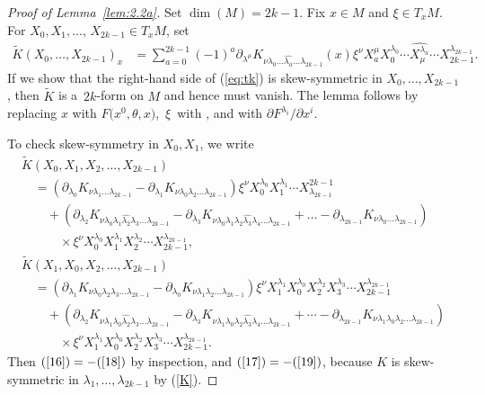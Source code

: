\documentclass[pdftex]{sigma}
\numberwithin{equation}{section}
\theoremstyle{definition}
\newcommand{\bm}{ M}
\begin{document}
\begin{proof}[Proof of Lemma~\ref{lem:2.2a}]
Set $\dim (M) = 2k-1. $ Fix
 $x\in \bm$ and $\xi\in T_x\bm$.
 For $X_0, X_1,\dots$, $ X_{2k-1}\in T_x\bm$, set
 \begin{align}\label{eq:tk}\tilde K(X_0,\dots, X_{2k-1})_x
&=
\sum_{a=0}^{2k-1} (-1)^a\partial_{\lambda^\mu} K_{\nu \lambda_0 \dots \widehat{\lambda_a}\dots\lambda_{2k-1}}
(x)\xi^\nu
X_a^{\mu} X_0^{\lambda_0}\cdots \widehat{X_\mu^{\lambda_a}} \cdots X_{2k-1}^{\lambda_{2k-1}}.
\end{align}
If we show that the right-hand side of (\ref{eq:tk}) is skew-symmetric in $X_0,\dots, X_{2k-1}$, then
$\tilde K
$ is a~$2k$-form on $\bm$ and hence must vanish. The lemma follows by replacing $x$ with
$F\bigl(x^0,\theta,x\bigr)$,~$\xi$~with , and  with $\partial F^{\lambda_i}/\partial x^i$.

To check skew-symmetry in $X_0, X_1$, we write
\begin{gather}
{\tilde{K}(X_0,X_1, X_2,\dots, X_{2k-1})
}\nonumber\\
\quad{}= (\partial_{\lambda_0} K_{\nu \lambda_1\dots \lambda_{2k-1}}
- \partial_{\lambda_1} K_{\nu \lambda_0 \lambda_2 \dots\lambda_{2k-1}})
\xi^\nu
X_0^{\lambda_0} X_1^{\lambda_1} \cdots X^{2k-1}_{\lambda_{2k-1}}
\label{16}\\
\qquad{}+ (\partial_{\lambda_2} K_{\nu \lambda_0 \lambda_1 \widehat{\lambda_2} \lambda_3\dots \lambda_{2k-1}}
-\partial_{\lambda_3} K_{\nu \lambda_0 \lambda_1 \lambda_2\widehat{\lambda_3}\lambda_4\dots \lambda_{2k-1}}
+\dots - \partial_{\lambda_{2k-1}}K_{\nu\lambda_0\dots\lambda_{2k-1}})\nonumber\\
\qquad\quad{} \times \xi^\nu X_0^{\lambda_0} X_1^{\lambda_1} X_2^{\lambda_2}\cdots X_{2k-1}^{\lambda_{2k-1}},\label{17}\\
{\tilde K(X_1,X_0, X_2, \dots,X_{2k-1}) }\nonumber\\
\quad{}= (\partial_{\lambda_1} K_{\nu \lambda_0\lambda_2\lambda_3\dots\lambda_{2k-1}}
- \partial_{\lambda_0} K_{\nu \lambda_1 \lambda_2\dots\lambda_{2k-1}}) \xi^\nu
X_1^{\lambda_1} X_0^{\lambda_0} X_2^{\lambda_2}X_3^{\lambda_3}\cdots X_{2k-1}^{\lambda_{2k-1}} \label{18}\\
\qquad{}+ (\partial_{\lambda_2} K_{\nu \lambda_1 \lambda_0 \widehat{\lambda_2} \lambda_3\dots \lambda_{2k-1}}
-\partial_{\lambda_3} K_{\nu \lambda_1 \lambda_0 \lambda_2\widehat{\lambda_3}\lambda_4\dots \lambda_{2k-1}}
+\cdots - \partial_{\lambda_{2k-1}}K_{\nu\lambda_1 \lambda_0 \lambda_2\dots\lambda_{2k-1}})\!\!\nonumber\\
\qquad\quad{} \times \xi^\nu X_1^{\lambda_1} X_0^{\lambda_0} X_2^{\lambda_2}X_3^{\lambda_3}\cdots X_{2k-1}^{\lambda_{2k-1}}.\label{19}
\end{gather}
Then $\text{(\ref{16})} = - \text{(\ref{18})}$ by inspection, and $\text{(\ref{17})} = - \text{(\ref{19})}$, because $K$ is skew-symmetric in $\lambda_1,\dots,\lambda_{2k-1}$ by (\ref{K}).


\end{proof}
\end{document}
